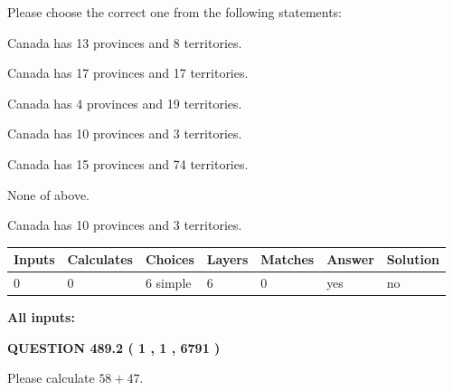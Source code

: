 \documentclass[12pt]{article}
\begin{document}
  
Please choose the correct one from the following statements:
 
 
Canada has  13 provinces and  8 territories.
 
 
Canada has  17 provinces and  17 territories.
 
 
Canada has   4 provinces and  19 territories.
 
 
Canada has 10  provinces and 3 territories.
 
 
Canada has  15 provinces and  74 territories.
 
 
 None of above.
 
 
\noindent{}
 
 
Canada has 10  provinces and 3 territories.
 
 
\noindent{}
 
 
   
   
   
   
\noindent\begin{tabular}{|l|l|l|l|l|l|l|}
 \hline
Inputs & Calculates & Choices & Layers & Matches & Answer & Solution \\ \hline
 0  & 
 0  & 
 6
  simple  
  & 
 6  & 
 0  & 
  yes & 
  no 
  \\ \hline
 \end{tabular}
   
   
   
   
\noindent{}
   
   
   
   
\noindent\vspace{0.1in}\hspace{-0.08in} {\textbf{\Large{All inputs: }}}
   
   
  
\vspace{0.2in}
  
{\textbf{\Large{QUESTION
489.2 
 ( 1 , 1 , 6791 )
}}}
  
  
 
Please calculate $ %
58 +  %
47 $.
 
 
   
\end{document}
